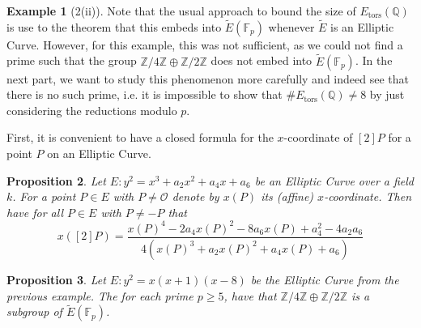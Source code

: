 \documentclass{scrartcl}
\newcommand{\Z}{\mathbb{Z}}
\newcommand{\F}{\mathbb{F}}
\newcommand{\Q}{\mathbb{Q}}
\renewcommand{\O}{\mathcal{O}}
\newtheorem{prop}{Proposition}
\theoremstyle{definition}
\newtheorem{example}[prop]{Example}
\begin{document}
\begin{example}[2(ii)]
    Note that the usual approach to bound the size of $E_{\mathrm{tors}}(\Q)$ is use to the theorem that this embeds into $\tilde{E}(\F_p)$ whenever $\tilde{E}$ is an Elliptic Curve.
    However, for this example, this was not sufficient, as we could not find a prime such that the group $\Z/4\Z \oplus \Z/2\Z$ does not embed into $\tilde{E}(\F_p)$.
    In the next part, we want to study this phenomenon more carefully and indeed see that there is no such prime, i.e. it is impossible to show that $\#E_{\mathrm{tors}}(\Q) \neq 8$ by just considering the reductions modulo $p$.
\end{example}
First, it is convenient to have a closed formula for the $x$-coordinate of $[2]P$ for a point $P$ on an Elliptic Curve.
\begin{prop}
    \label{prop:duplication_formula}
    Let $E: y^2 = x^3 + a_2 x^2 + a_4 x + a_6$ be an Elliptic Curve over a field $k$.
    For a point $P \in E$ with $P \neq \O$ denote by $x(P)$ its (affine) $x$-coordinate.
    Then have for all $P \in E$ with $P \neq -P$ that
    \begin{equation*}
        x([2]P) = \frac {x(P)^4 - 2a_4 x(P)^2 - 8a_6x(P) + a_4^2 - 4a_2a_6} {4(x(P)^3 + a_2 x(P)^2 + a_4 x(P) + a_6)}
    \end{equation*}  
\end{prop}
\begin{prop}
    Let $E: y^2 = x(x + 1)(x - 8)$ be the Elliptic Curve from the previous example.
    The for each prime $p \geq 5$, have that $\Z/4\Z \oplus \Z/2\Z$ is a subgroup of $\tilde{E}(\F_p)$.
\end{prop}
\end{document}
